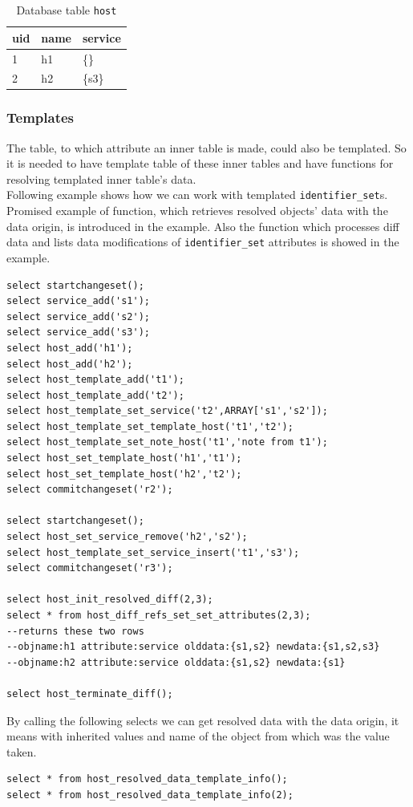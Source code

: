 \documentclass[deska]{subfiles}
\begin{document}
\begin{longtable}{ l | l | l }
    \caption{Database table {\tt host}}\\
    uid & name & service\\
    \hline
    \endhead
\label{tab:multi-hostv}
    1 & h1 & \{\}\\
    2 & h2 & \{s3\}\\
    \hline
\end{longtable}

\subsubsection{Templates}
The table, to which attribute an inner table is made, could also be templated. So it is needed to have template table of these inner tables and have functions for resolving templated inner table's data.\\
Following example shows how we can work with templated {\tt identifier\_set}s. Promised example of function, which retrieves resolved objects' data with the data origin, is introduced in the example. Also the function which processes diff data and lists data modifications of {\tt identifier\_set} attributes is showed in the example.\\

\begin{verbatim}
select startchangeset();
select service_add('s1');
select service_add('s2');
select service_add('s3');
select host_add('h1');
select host_add('h2');
select host_template_add('t1');
select host_template_add('t2');
select host_template_set_service('t2',ARRAY['s1','s2']);
select host_template_set_template_host('t1','t2');
select host_template_set_note_host('t1','note from t1');
select host_set_template_host('h1','t1');
select host_set_template_host('h2','t2');
select commitchangeset('r2');

select startchangeset();
select host_set_service_remove('h2','s2');
select host_template_set_service_insert('t1','s3');
select commitchangeset('r3');

select host_init_resolved_diff(2,3);
select * from host_diff_refs_set_set_attributes(2,3);
--returns these two rows
--objname:h1 attribute:service olddata:{s1,s2} newdata:{s1,s2,s3}
--objname:h2 attribute:service olddata:{s1,s2} newdata:{s1}

select host_terminate_diff();
\end{verbatim}

By calling the following selects we can get resolved data with the data origin, it means with inherited values and name of the object from which was the value taken.\\
\begin{verbatim}
select * from host_resolved_data_template_info();
select * from host_resolved_data_template_info(2);
\end{verbatim}
\end{document}
